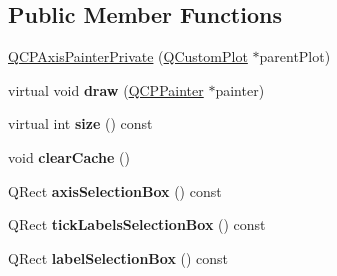 \subsection*{Public Member Functions}
\begin{DoxyCompactItemize}
\item 
\hyperlink{classQCPAxisPainterPrivate_a0f14aa5c4aa83dbcd68984a7c73bf94f}{Q\+C\+P\+Axis\+Painter\+Private} (\hyperlink{classQCustomPlot}{Q\+Custom\+Plot} $\ast$parent\+Plot)
\item 
\mbox{\label{classQCPAxisPainterPrivate_a0207a99bdf9c4f70af20928898ddc2fc}} 
virtual void {\bfseries draw} (\hyperlink{classQCPPainter}{Q\+C\+P\+Painter} $\ast$painter)
\item 
\mbox{\label{classQCPAxisPainterPrivate_a60fc2eec99ed23e9a3c98e8f7e5730b0}} 
virtual int {\bfseries size} () const
\item 
\mbox{\label{classQCPAxisPainterPrivate_a7b6806e32c44384fd0ae4dcdaa72b1b5}} 
void {\bfseries clear\+Cache} ()
\item 
\mbox{\label{classQCPAxisPainterPrivate_ab29635564acb5d0012fa9e297477db05}} 
Q\+Rect {\bfseries axis\+Selection\+Box} () const
\item 
\mbox{\label{classQCPAxisPainterPrivate_acf8a4fef47cec70b596fe20941aa5b16}} 
Q\+Rect {\bfseries tick\+Labels\+Selection\+Box} () const
\item 
\mbox{\label{classQCPAxisPainterPrivate_ae7800667d15867040ada5f4bf027f070}} 
Q\+Rect {\bfseries label\+Selection\+Box} () const
\end{DoxyCompactItemize}

